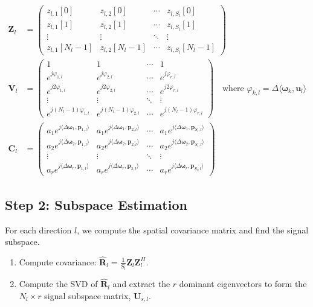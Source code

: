 \begin{align*}
 \mathbf{Z}_l &= \begin{pmatrix}
z_{l,1}[0] & z_{l,2}[0] & \cdots & z_{l,S_l}[0] \\
z_{l,1}[1] & z_{l,2}[1] & \cdots & z_{l,S_l}[1] \\
\vdots & \vdots & \ddots & \vdots \\
z_{l,1}[N_l-1] & z_{l,2}[N_l-1] & \cdots & z_{l,S_l}[N_l-1]
\end{pmatrix} \\[5ex]
 \mathbf{V}_l &= \begin{pmatrix}
1 & 1 & \cdots & 1 \\
e^{j\varphi_{1,l}} & e^{j\varphi_{2,l}} & \cdots & e^{j\varphi_{r,l}} \\
e^{j2\varphi_{1,l}} & e^{j2\varphi_{2,l}} & \cdots & e^{j2\varphi_{r,l}} \\
\vdots & \vdots & \ddots & \vdots \\
e^{j(N_l-1)\varphi_{1,l}} & e^{j(N_l-1)\varphi_{2,l}} & \cdots & e^{j(N_l-1)\varphi_{r,l}}
\end{pmatrix} \quad \text{where } \varphi_{k,l} = \Delta \langle \boldsymbol{\omega}_k, \boldsymbol{u}_l \rangle  \\[5ex]
 \mathbf{C}_l &= \begin{pmatrix}
a_{1}e^{j\langle \Delta \boldsymbol{\omega}_{1},\boldsymbol{p}_{1,l}\rangle} & a_{1}e^{j\langle \Delta \boldsymbol{\omega}_{1},\boldsymbol{p}_{2,l}\rangle} & \cdots & a_{1}e^{j\langle \Delta \boldsymbol{\omega}_{1},\boldsymbol{p}_{S_l,l}\rangle} \\
a_{2}e^{j\langle \Delta \boldsymbol{\omega}_{2},\boldsymbol{p}_{1,l}\rangle} & a_{2}e^{j\langle \Delta \boldsymbol{\omega}_{2},\boldsymbol{p}_{2,l}\rangle} & \cdots & a_{2}e^{j\langle \Delta \boldsymbol{\omega}_{2},\boldsymbol{p}_{S_l,l}\rangle} \\
\vdots & 
\vdots & \ddots & \vdots \\
a_{r}e^{j\langle \Delta \boldsymbol{\omega}_{r},\boldsymbol{p}_{1,l}\rangle} & a_{r}e^{j\langle \Delta \boldsymbol{\omega}_{r},\boldsymbol{p}_{2,l}\rangle} & \cdots & a_{r}e^{j\langle \Delta \boldsymbol{\omega}_{r},\boldsymbol{p}_{S_l,l}\rangle}
\end{pmatrix} 
\end{align*}

\subsection{Step 2: Subspace Estimation}
For each direction $l$, we compute the spatial covariance matrix and find the signal subspace.
\begin{enumerate}
    \item Compute covariance: $\hat{\mathbf{R}}_l = \frac{1}{S_l} \mathbf{Z}_l \mathbf{Z}_l^H$.
    \item Compute the SVD of $\hat{\mathbf{R}}_l$ and extract the $r$ dominant eigenvectors to form the $N_l \times r$ signal subspace matrix, $\mathbf{U}_{s,l}$.
\end{enumerate}

